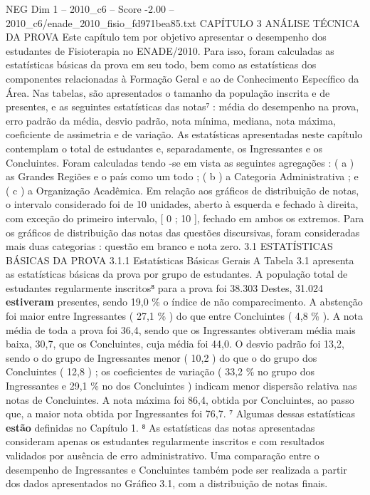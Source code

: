 \begin{textsample}{NEG Dim 1 – 2010\_c6 – Score -2.00 – 2010\_c6/enade\_2010\_fisio\_fd971bea85.txt}  \label{ex:f1_neg_275}
CAPÍTULO 3 ANÁLISE TÉCNICA DA PROVA Este capítulo tem por objetivo apresentar o desempenho dos estudantes de Fisioterapia no ENADE/2010.
Para isso, foram calculadas as estatísticas básicas da prova em seu todo, bem como as estatísticas dos componentes relacionadas à Formação Geral e ao de Conhecimento Específico da Área.
Nas tabelas, são apresentados o tamanho da população inscrita e de presentes, e as seguintes estatísticas das notas⁷ : média do desempenho na prova, erro padrão da média, desvio padrão, nota mínima, mediana, nota máxima, coeficiente de assimetria e de variação.
As estatísticas apresentadas neste capítulo contemplam o total de estudantes e, separadamente, os Ingressantes e os Concluintes.
Foram calculadas tendo -se em vista as seguintes agregações : ( a ) as Grandes Regiões e o país como um todo ; ( b ) a Categoria Administrativa ; e ( c ) a Organização Acadêmica.
Em relação aos gráficos de distribuição de notas, o intervalo considerado foi de 10 unidades, aberto à esquerda e fechado à direita, com exceção do primeiro intervalo, [ 0 ; 10 ], fechado em ambos os extremos.
Para os gráficos de distribuição das notas das questões discursivas, foram consideradas mais duas categorias : questão em branco e nota zero. 3.1 ESTATÍSTICAS BÁSICAS DA PROVA 3.1.1 Estatísticas Básicas Gerais A Tabela 3.1 apresenta as estatísticas básicas da prova por grupo de estudantes.
A população total de estudantes regularmente inscritos⁸ para a prova foi 38.303 Destes, 31.024 \textbf{estiveram} presentes, sendo 19,0 \% o índice de não comparecimento.
A abstenção foi maior entre Ingressantes ( 27,1 \% ) do que entre Concluintes ( 4,8 \% ).
A nota média de toda a prova foi 36,4, sendo que os Ingressantes obtiveram média mais baixa, 30,7, que os Concluintes, cuja média foi 44,0.
O desvio padrão foi 13,2, sendo o do grupo de Ingressantes menor ( 10,2 ) do que o do grupo dos Concluintes ( 12,8 ) ; os coeficientes de variação ( 33,2 \% no grupo dos Ingressantes e 29,1 \% no dos Concluintes ) indicam menor dispersão relativa nas notas de Concluintes.
A nota máxima foi 86,4, obtida por Concluintes, ao passo que, a maior nota obtida por Ingressantes foi 76,7. ⁷ Algumas dessas estatísticas \textbf{estão} definidas no Capítulo 1. ⁸ As estatísticas das notas apresentadas consideram apenas os estudantes regularmente inscritos e com resultados validados por ausência de erro administrativo.
Uma comparação entre o desempenho de Ingressantes e Concluintes também pode ser realizada a partir dos dados apresentados no Gráfico 3.1, com a distribuição de notas finais.

\end{textsample}
